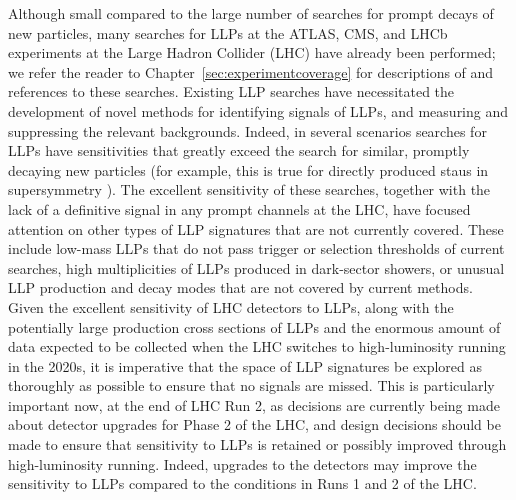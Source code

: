 Although small compared to the large number of searches for prompt decays of new particles, many searches for LLPs at the ATLAS, CMS, and LHCb experiments at the Large Hadron Collider (LHC) have already been performed; we refer the reader to Chapter~\ref{sec:experimentcoverage} for descriptions of and references to these searches. Existing LLP searches have necessitated the development of novel methods for identifying signals of LLPs, and measuring and suppressing the relevant backgrounds.
Indeed, in several scenarios searches for LLPs have sensitivities that greatly exceed the search for similar, promptly decaying new particles (for example, this is true for directly produced staus in supersymmetry \cite{CMS-PAS-EXO-16-036}).
The excellent sensitivity of these searches, together with the lack of a definitive signal in any prompt channels at the LHC, have focused attention on other types of LLP signatures that are not currently covered.
These include low-mass LLPs that do not pass trigger or selection thresholds of current searches, high multiplicities of LLPs produced in dark-sector showers, or unusual LLP production and decay modes that are not covered by current methods.
Given the excellent  sensitivity of LHC detectors to LLPs, along with the potentially large production cross sections of LLPs and the enormous amount of data expected to be collected when the LHC switches to high-luminosity running in the 2020s, it is imperative that the space of LLP signatures be explored as thoroughly as possible to ensure that no signals are missed.
This is particularly important now, at the end of LHC Run 2, as decisions are currently being made about detector upgrades for Phase 2 of the LHC, and design decisions should be made to ensure that sensitivity to LLPs is retained or possibly improved through high-luminosity running.
Indeed, upgrades to the detectors may improve the sensitivity to LLPs compared to the conditions in Runs 1 and 2 of the LHC.

